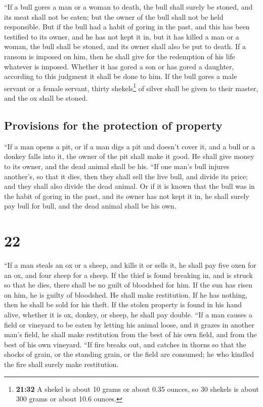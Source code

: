  ``If a bull gores a man or a woman to death, the bull
shall surely be stoned, and its meat shall not be eaten; but the owner
of the bull shall not be held responsible.  But if the
bull had a habit of goring in the past, and this has been testified to
its owner, and he has not kept it in, but it has killed a man or a
woman, the bull shall be stoned, and its owner shall also be put to
death.  If a ransom is imposed on him, then he shall give
for the redemption of his life whatever is imposed. 
Whether it has gored a son or has gored a daughter, according to this
judgment it shall be done to him.  If the bull gores a
male servant or a female servant, thirty shekels\footnote{\textbf{21:32}
  A shekel is about 10 grams or about 0.35 ounces, so 30 shekels is
  about 300 grams or about 10.6 ounces.} of silver shall be given to
their master, and the ox shall be stoned.

\hypertarget{provisions-for-the-protection-of-property}{%
\subsection{Provisions for the protection of
property}\label{provisions-for-the-protection-of-property}}

 ``If a man opens a pit, or if a man digs a pit and
doesn't cover it, and a bull or a donkey falls into it, 
the owner of the pit shall make it good. He shall give money to its
owner, and the dead animal shall be his.  ``If one man's
bull injures another's, so that it dies, then they shall sell the live
bull, and divide its price; and they shall also divide the dead animal.
 Or if it is known that the bull was in the habit of
goring in the past, and its owner has not kept it in, he shall surely
pay bull for bull, and the dead animal shall be his own.

\hypertarget{section-21}{%
\section{22}\label{section-21}}

 ``If a man steals an ox or a sheep, and kills it or sells
it, he shall pay five oxen for an ox, and four sheep for a sheep.
 If the thief is found breaking in, and is struck so that
he dies, there shall be no guilt of bloodshed for him.  If
the sun has risen on him, he is guilty of bloodshed. He shall make
restitution. If he has nothing, then he shall be sold for his theft.
 If the stolen property is found in his hand alive,
whether it is ox, donkey, or sheep, he shall pay double. 
``If a man causes a field or vineyard to be eaten by letting his animal
loose, and it grazes in another man's field, he shall make restitution
from the best of his own field, and from the best of his own vineyard.
 ``If fire breaks out, and catches in thorns so that the
shocks of grain, or the standing grain, or the field are consumed; he
who kindled the fire shall surely make restitution.

